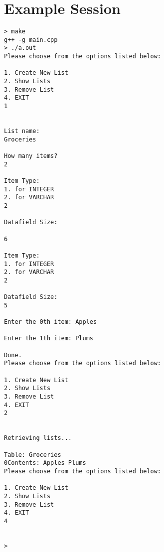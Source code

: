 \documentclass{article}
\begin{document}
\section{Example Session}
\begin{verbatim}
> make
g++ -g main.cpp
> ./a.out
Please choose from the options listed below: 

1. Create New List 
2. Show Lists 
3. Remove List 
4. EXIT 
1


List name:
Groceries

How many items?
2

Item Type:
1. for INTEGER
2. for VARCHAR
2

Datafield Size:

6

Item Type:
1. for INTEGER
2. for VARCHAR
2

Datafield Size:
5

Enter the 0th item: Apples

Enter the 1th item: Plums

Done.
Please choose from the options listed below: 

1. Create New List 
2. Show Lists 
3. Remove List 
4. EXIT 
2


Retrieving lists...

Table: Groceries
0Contents: Apples Plums 
Please choose from the options listed below: 

1. Create New List 
2. Show Lists 
3. Remove List 
4. EXIT 
4


>
\end{verbatim}
\end{document}
